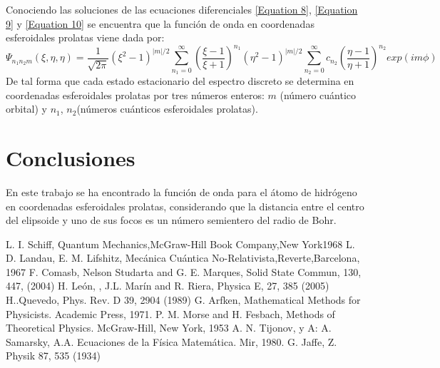 \documentclass[12pt]{article}
\begin{document}
        Conociendo las soluciones de las ecuaciones 
        diferenciales \eqref{Equation 8}, \eqref{Equation 9} y \eqref{Equation 10} se encuentra que la 
        función de onda en coordenadas esferoidales 
        prolatas viene dada por:
        \begin{equation}
            \Psi_{n_{1}n_{2}m}\left(\xi,\eta,\eta\right) = \dfrac{1}{\sqrt{2\pi}}\left(\xi^{2}-1\right)^{|m|/2}\sum\limits_{n_{1} = 0}^{\infty}\left(\dfrac{\xi-1}{\xi+1}\right)^{n_{1}} \left(\eta^{2}-1\right)^{|m|/2}\sum\limits_{n_{2} = 0}^{\infty}c_{n_{2}}\left(\dfrac{\eta-1}{\eta +1}\right)^{n_{2}}exp(im\phi)
        \end{equation}
        De tal forma que cada estado estacionario del 
        espectro discreto se determina en coordenadas 
        esferoidales prolatas por tres números enteros: 
        $m$ (número cuántico orbital) y 
        $n_{1}$, $n_{2}$(números cuánticos esferoidales prolatas).

        \section{Conclusiones}
        En este trabajo se ha encontrado la 
        función de onda para el átomo de hidrógeno 
        en coordenadas esferoidales prolatas, 
        considerando que la distancia entre el centro 
        del elipsoide y uno de sus focos es un número 
        semientero del radio de Bohr.

        \begin{thebibliography}{10}
             L. I. Schiff, Quantum Mechanics,McGraw-Hill Book Company,New York1968
             L. D. Landau, E. M. Lifshitz, Mecánica Cuántica No-Relativista,Reverte,Barcelona, 1967
             F. Comasb, Nelson Studarta and G. E. Marques, Solid State Commun, 130, 447, (2004)
             H. León, , J.L. Marín and R. Riera, Physica E, 27, 385 (2005)
             H..Quevedo, Phys. Rev. D 39, 2904 (1989)
             G. Arfken, Mathematical Methods for Physicists. Academic Press, 1971.
             P. M. Morse and H. Fesbach, Methods of Theoretical Physics. McGraw-Hill, New York, 1953
             A. N. Tijonov, y A: A. Samarsky, A.A. Ecuaciones de la Física Matemática. Mir, 1980.
             G. Jaffe, Z. Physik 87, 535 (1934)
        \end{thebibliography}

\end{document}
